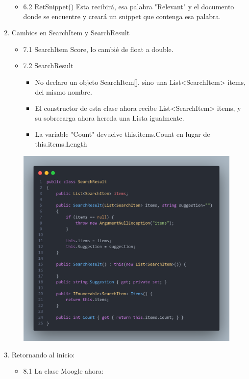 \documentclass{article}
\begin{document}
\begin{enumerate}
\begin{itemize}
\begin{itemize}
            \end{itemize}
            \item 6.2 RetSnippet() Esta recibirá, esa palabra "Relevant" y el documento donde se encuentre y creará un snippet que contenga esa palabra.
        \end{itemize}
        \newpage
    \item Cambios en SearchItem y SearchResult
        \begin{itemize}
            \item 7.1 SearchItem Score, lo cambié de float a double.
            \item 7.2 SearchResult
            \begin{itemize}
                \item No declaro un objeto SearchItem[], sino una List<SearchItem> items, del mismo nombre.
                \item El constructor de esta clase ahora recibe List<SearchItem> items, y su sobrecarga ahora hereda una Lista igualmente.
                \item La variable "Count" devuelve this.items.Count en lugar de this.items.Length
            \end{itemize}
        \includegraphics[width=420px]{Assets/SearchResult.png}
        \end{itemize}
        \newpage
    \item Retornando al inicio:
        \begin{itemize}
            \item 8.1 La clase Moogle ahora:
                \begin{itemize}

\end{itemize}
\end{itemize}
\end{enumerate}
\end{document}
